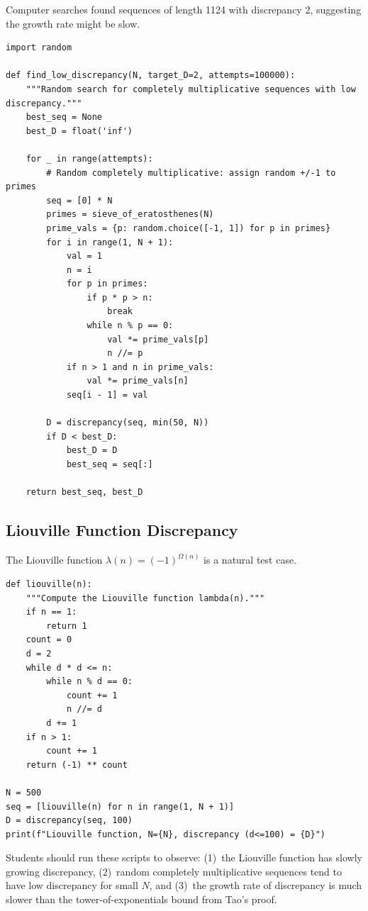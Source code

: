 Computer searches found sequences of length 1124 with discrepancy 2, suggesting the growth rate might be slow.

\begin{verbatim}
import random

def find_low_discrepancy(N, target_D=2, attempts=100000):
    """Random search for completely multiplicative sequences with low discrepancy."""
    best_seq = None
    best_D = float('inf')

    for _ in range(attempts):
        # Random completely multiplicative: assign random +/-1 to primes
        seq = [0] * N
        primes = sieve_of_eratosthenes(N)
        prime_vals = {p: random.choice([-1, 1]) for p in primes}
        for i in range(1, N + 1):
            val = 1
            n = i
            for p in primes:
                if p * p > n:
                    break
                while n % p == 0:
                    val *= prime_vals[p]
                    n //= p
            if n > 1 and n in prime_vals:
                val *= prime_vals[n]
            seq[i - 1] = val

        D = discrepancy(seq, min(50, N))
        if D < best_D:
            best_D = D
            best_seq = seq[:]

    return best_seq, best_D
\end{verbatim}

\subsection{Liouville Function Discrepancy}

The Liouville function $\lambda(n) = (-1)^{\Omega(n)}$ is a natural test case.

\begin{verbatim}
def liouville(n):
    """Compute the Liouville function lambda(n)."""
    if n == 1:
        return 1
    count = 0
    d = 2
    while d * d <= n:
        while n % d == 0:
            count += 1
            n //= d
        d += 1
    if n > 1:
        count += 1
    return (-1) ** count

N = 500
seq = [liouville(n) for n in range(1, N + 1)]
D = discrepancy(seq, 100)
print(f"Liouville function, N={N}, discrepancy (d<=100) = {D}")
\end{verbatim}

\begin{highlightbox}
Students should run these scripts to observe: (1)~the Liouville function has slowly growing discrepancy, (2)~random completely multiplicative sequences tend to have low discrepancy for small $N$, and (3)~the growth rate of discrepancy is much slower than the tower-of-exponentials bound from Tao's proof.
\end{highlightbox}

